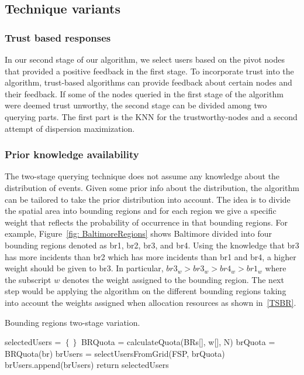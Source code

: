 \documentclass{acm_proc_article-sp}
\begin{document}
\subsection{Technique variants}
\subsubsection{Trust based responses}
In our second stage of our algorithm, we select users based on the pivot nodes that provided a positive feedback in the first stage. To incorporate trust into the algorithm, trust-based algorithms can provide feedback about certain nodes and their feedback. If some of the nodes queried in the first stage of the algorithm were deemed trust unworthy, the second stage can be divided among two querying parts. The first part is the KNN for the trustworthy-nodes and a second attempt of dispersion maximization.  
\subsubsection{Prior knowledge availability}
The two-stage querying technique does not assume any knowledge about the distribution of events. Given some prior info about the distribution, the algorithm can be tailored to take the prior distribution into account. The idea is to divide the spatial area into bounding regions and for each region we give a specific weight that reflects the probability of occurrence in that bounding regions.
For example, Figure~\ref{fig: BaltimoreRegions} shows Baltimore divided into four bounding regions denoted as br1, br2, br3, and br4. Using the knowledge that br3 has more incidents than br2 which has more incidents than br1 and br4, a higher weight should be given to br3. In particular, $br3_w > br3_w> br4_w> br1_w$ where the subscript $w$ denotes the weight assigned to the bounding region. The next step would be applying the algorithm on the different bounding regions taking into account the weights assigned when allocation resources as shown in~\ref{TSBR}.

\begin{algorithm}
\caption{Bounding regions two-stage variation.}
\label{TSBR}
  \begin{algorithmic}[1]
      \State selectedUsers = $\left\{\right\}$
       \State BRQuota = calculateQuota(BRs[], w[], N)
        \State brQuota = BRQuota(br)
      \State brUsers = selectUsersFromGrid(FSP, brQuota)
      \State brUsers.append(brUsers)
    \EndFor
\State return {selectedUsers}
\EndFunction
\end{algorithmic}
\end{algorithm}
\end{document}
